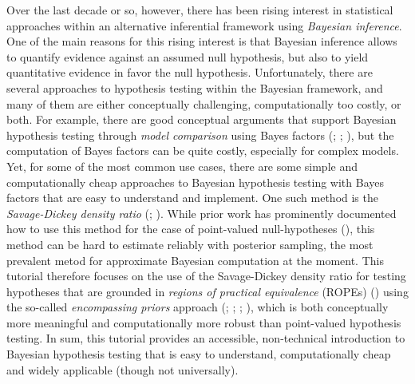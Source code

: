 \documentclass[
  doc,
  floatsintext,
  longtable,
  nolmodern,
  notxfonts,
  notimes,
  colorlinks=true,linkcolor=blue,citecolor=blue,urlcolor=blue]{apa7}
\begin{document}
Over the last decade or so, however, there has been rising interest in
statistical approaches within an alternative inferential framework using
\emph{Bayesian inference}. One of the main reasons for this rising
interest is that Bayesian inference allows to quantify evidence against
an assumed null hypothesis, but also to yield quantitative evidence in
favor the null hypothesis. Unfortunately, there are several approaches
to hypothesis testing within the Bayesian framework, and many of them
are either conceptually challenging, computationally too costly, or
both. For example, there are good conceptual arguments that support
Bayesian hypothesis testing through \emph{model comparison} using Bayes
factors (; ;
), but the computation of Bayes factors can be quite
costly, especially for complex models. Yet, for some of the most common
use cases, there are some simple and computationally cheap approaches to
Bayesian hypothesis testing with Bayes factors that are easy to
understand and implement. One such method is the \emph{Savage-Dickey
density ratio} (;
). While prior work has prominently documented how to use this
method for the case of point-valued null-hypotheses
(), this method can be hard to estimate reliably with posterior
sampling, the most prevalent metod for approximate Bayesian computation
at the moment. This tutorial therefore focuses on the use of the
Savage-Dickey density ratio for testing hypotheses that are grounded in
\emph{regions of practical equivalence} (ROPEs)
()
using the so-called \emph{encompassing priors} approach
(;
; ;
), which is both conceptually more meaningful and computationally
more robust than point-valued hypothesis testing. In sum, this tutorial
provides an accessible, non-technical introduction to Bayesian
hypothesis testing that is easy to understand, computationally cheap and
widely applicable (though not universally).
\end{document}
